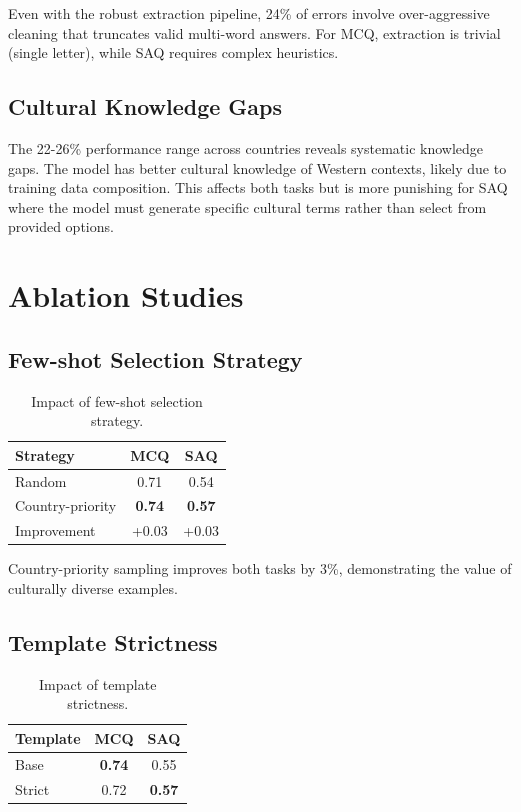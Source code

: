\documentclass[11pt,a4paper,twocolumn]{article}
\begin{document}
Even with the robust extraction pipeline, 24\% of errors involve over-aggressive cleaning that truncates valid multi-word answers. For MCQ, extraction is trivial (single letter), while SAQ requires complex heuristics.

\subsection{Cultural Knowledge Gaps}

The 22-26\% performance range across countries reveals systematic knowledge gaps. The model has better cultural knowledge of Western contexts, likely due to training data composition. This affects both tasks but is more punishing for SAQ where the model must generate specific cultural terms rather than select from provided options.

\section{Ablation Studies}

\subsection{Few-shot Selection Strategy}

\begin{table}[h]
\centering
\small
\begin{tabular}{lcc}
\toprule
\textbf{Strategy} & \textbf{MCQ} & \textbf{SAQ} \\
\midrule
Random & 0.71 & 0.54 \\
Country-priority & \textbf{0.74} & \textbf{0.57} \\
\midrule
Improvement & +0.03 & +0.03 \\
\bottomrule
\end{tabular}
\caption{Impact of few-shot selection strategy.}
\label{tab:ablation_selection}
\end{table}

Country-priority sampling improves both tasks by 3\%, demonstrating the value of culturally diverse examples.

\subsection{Template Strictness}

\begin{table}[h]
\centering
\small
\begin{tabular}{lcc}
\toprule
\textbf{Template} & \textbf{MCQ} & \textbf{SAQ} \\
\midrule
Base & \textbf{0.74} & 0.55 \\
Strict & 0.72 & \textbf{0.57} \\
\bottomrule
\end{tabular}
\caption{Impact of template strictness.}
\label{tab:ablation_template}
\end{table}
\end{document}
